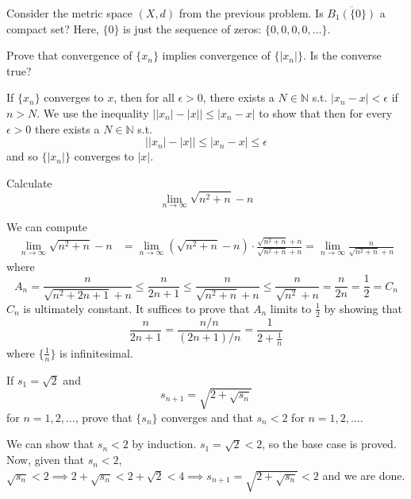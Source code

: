   \begin{exercise}
    Consider the metric space $(X,d)$ from the previous problem. Is $\overline{B_1(\{0\})}$
    a compact set? Here, $\{0\}$ is just the sequence of zeros: $\{0,0,0,0,\ldots\}$.
  \end{exercise}
  
  \begin{exercise}[Rudin 3.1]
    Prove that convergence of $\{x_n\}$ implies convergence of $\{|x_n|\}$. Is the converse true? 
  \end{exercise}
  \begin{solution}
    If $\{x_n\}$ converges to $x$, then for all $\epsilon > 0$, there exists a $N \in \mathbb{N}$ s.t. $|x_n - x| < \epsilon$ if $n > N$. We use the inequality $\big| |x_n| - |x| \big| \leq |x_n - x|$ to show that then for every $\epsilon > 0$ there exists a $N \in \mathbb{N}$ s.t. 
    \[ \big| |x_n| - |x| \big| \leq |x_n - x| \leq \epsilon \]
    and so $\{|x_n|\}$ converges to $|x|$. 
  \end{solution}

  \begin{exercise}[Rudin 3.2]
    Calculate 
    \[\lim_{n \rightarrow \infty} \sqrt{n^2 + n} - n\]
  \end{exercise}
  \begin{solution}
    We can compute  
    \begin{align*}
        \lim_{n \rightarrow \infty} \sqrt{n^2 + n} - n & = \lim_{n \rightarrow \infty} (\sqrt{n^2 + n} - n) \cdot \frac{\sqrt{n^2 + n} + n}{\sqrt{n^2 + n} + n} = \lim_{n \rightarrow \infty} \frac{n}{\sqrt{n^2 + n} + n}
    \end{align*}
    where 
    \[A_n = \frac{n}{\sqrt{n^2 + 2n + 1} + n} \leq \frac{n}{2n + 1} \leq \frac{n}{\sqrt{n^2 + n} + n} \leq \frac{n}{\sqrt{n^2} + n} = \frac{n}{2n} = \frac{1}{2} = C_n\]
    $C_n$ is ultimately constant. It suffices to prove that $A_n$ limits to $\frac{1}{2}$ by showing that 
    \[\frac{n}{2n + 1} = \frac{n/n}{(2n+1)/n} = \frac{1}{2 + \frac{1}{n}}\]
    where $\{\frac{1}{n}\}$ is infinitesimal. 
  \end{solution}

  \begin{exercise}[Rudin 3.3]
    If $s_1 = \sqrt{2}$ and 
    \[s_{n+1} = \sqrt{2 + \sqrt{s_n}}\]
    for $n = 1, 2, \ldots$, prove that $\{s_n\}$ converges and that $s_n < 2$ for $n = 1, 2, \ldots$. 
  \end{exercise}
  \begin{solution}
    We can show that $s_n < 2$ by induction. $s_1 = \sqrt{2} < 2$, so the base case is proved. Now, given that $s_n < 2$, $\sqrt{s_n} < 2 \implies 2 + \sqrt{s_n} < 2 + \sqrt{2} < 4 \implies s_{n+1} = \sqrt{2 + \sqrt{s_n}} < 2$ and we are done. 
  \end{solution}

